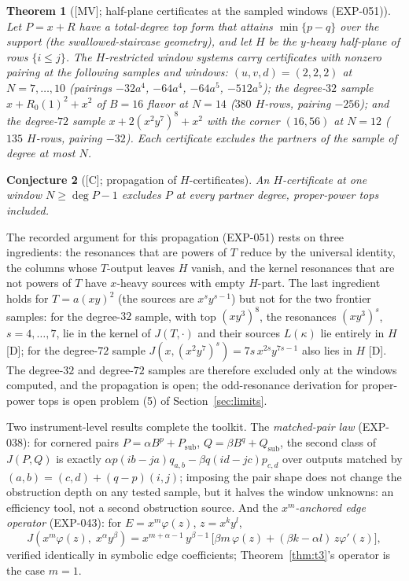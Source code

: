 \documentclass[11pt]{article}
\newtheorem{theorem}{Theorem}[section]
\newtheorem{conjecture}[theorem]{Conjecture}
\theoremstyle{remark}
\begin{document}
\begin{theorem}[{[MV]}; half-plane certificates at the sampled windows (EXP-051)]\label{thm:halfplane}
Let $P = x + R$ have a total-degree top form that attains $\min\{p - q\}$ over the support
(the swallowed-staircase geometry), and let $H$ be the $y$-heavy half-plane of rows
$\{i \le j\}$. The $H$-restricted window systems carry certificates with nonzero pairing at the following samples and
windows: $(u,v,d)=(2,2,2)$ at $N=7,\dots,10$ (pairings $-32a^4$, $-64a^4$, $-64a^5$, $-512a^5$); the degree-$32$ sample
$x+R_0(1)^2+x^2$ of $B=16$ flavor at $N=14$ ($380$ $H$-rows, pairing $-256$); and the degree-$72$ sample
$x+2(x^2y^7)^8+x^2$ with the corner $(16,56)$ at $N=12$ ($135$ $H$-rows, pairing $-32$). Each certificate excludes the partners of the sample
of degree at most $N$.
\end{theorem}

\begin{conjecture}[{[C]}; propagation of $H$-certificates]\label{conj:halfplane}
An $H$-certificate at one window $N\ge\deg P-1$ excludes $P$ at every partner degree, proper-power tops included.
\end{conjecture}

The recorded argument for this propagation (EXP-051) rests on three ingredients: the resonances that are powers of $T$ reduce by the universal
identity, the columns whose $T$-output leaves $H$ vanish, and the kernel resonances that are not powers of $T$ have $x$-heavy sources with
empty $H$-part. The last ingredient holds for $T=a(xy)^2$ (the sources are $x^sy^{s-1}$) but not for the two frontier samples: for the degree-$32$ sample, with top
$(xy^3)^8$, the resonances $(xy^3)^s$, $s=4,\dots,7$, lie in the kernel of $J(T,\cdot)$ and their sources $L(\kappa)$ lie entirely in $H$ [D]; for the degree-$72$
sample $J(x,(x^2y^7)^s)=7s\,x^{2s}y^{7s-1}$ also lies in $H$ [D]. The degree-$32$ and degree-$72$ samples are therefore excluded
only at the windows computed, and the propagation is open; the odd-resonance derivation for proper-power tops is open problem (5) of Section~\ref{sec:limits}.

Two instrument-level results complete the toolkit. The \emph{matched-pair law} (EXP-038):
for cornered pairs $P = \alpha B^p + P_{\mathrm{sub}}$, $Q = \beta B^q + Q_{\mathrm{sub}}$,
the second class of $J(P, Q)$ is exactly
$\alpha p (ib - ja) q_{a,b} - \beta q (id - jc) p_{c,d}$ over outputs matched by
$(a, b) = (c, d) + (q - p)(i, j)$; imposing the pair shape does not change the obstruction
depth on any tested sample, but it halves the window unknowns: an efficiency tool, not a
second obstruction source. And the \emph{$x^m$-anchored edge operator} (EXP-043): for
$E = x^m \varphi(z)$, $z = x^k y^l$,
\[
J\left(x^m \varphi(z),\; x^{\alpha} y^{\beta}\right)
= x^{m + \alpha - 1}\, y^{\beta - 1}\,
\bigl[\beta m\, \varphi(z) + (\beta k - \alpha l)\, z\varphi'(z)\bigr],
\]
verified identically in symbolic edge coefficients; Theorem~\ref{thm:t3}'s operator is the
case $m = 1$.
\end{document}
